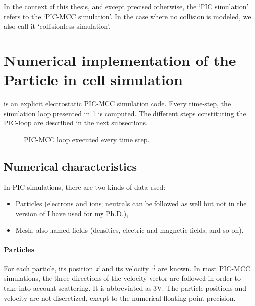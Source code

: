     In the context of this thesis, and except precised otherwise, the `\ac{PIC} simulation' refers to the `\ac{PIC}-\ac{MCC} simulation'.
    In the case where no collision is modeled, we also call it `collisionless simulation'.
\section{Numerical implementation of the Particle in cell simulation}

  \LPPic is an explicit electrostatic \ac{PIC}-\ac{MCC} simulation code.
  Every time-step, the simulation loop presented in \cref{fig-picloop} is computed.
  The different steps constituting the PIC-loop are described in the next subsections.
  \begin{figure}[hbt]
    \centering
    \caption{\acs{PIC}-\acs{MCC} loop executed every time step.}
    \label{fig-picloop}
  \end{figure}


  \subsection{Numerical characteristics}
    In \ac{PIC} simulations, there are two kinds of data used\string:
    \begin{itemize}
      \item Particles (electrons and ions; neutrals can be followed as well but not in the version of \LPPic I have used for my Ph.D.),
      \item Mesh, also named fields (densities, electric and magnetic fields, and so on).
    \end{itemize}


    \paragraph{Particles\\}
    For each particle, its position $\vec{x}$ and its velocity $\vec{v}$ are known.
    In most \ac{PIC}-\ac{MCC} simulations, the three directions of the velocity vector are followed in order to take into account scattering.
    It is abbreviated as \acs{3V}.
    The particle positions and velocity are not discretized, except to the numerical floating-point precision.

